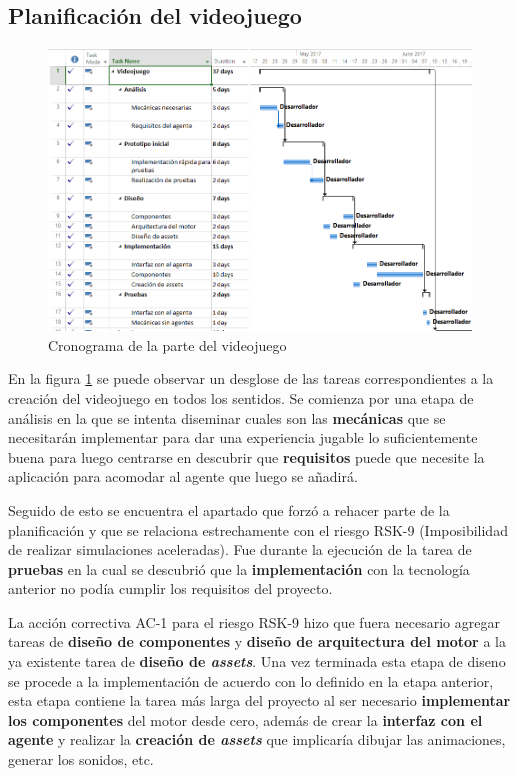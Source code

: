 \subsection{Planificación del videojuego}

\begin{figure}
	\centerline{\includegraphics[width=19cm]{otros/capturasPlanificacion/videojuego.PNG}}
	\caption{Cronograma de la parte del videojuego}
	\label{plan:videojuego}
\end{figure}

En la figura \ref{plan:videojuego} se puede observar un desglose de las tareas correspondientes a la creación del videojuego en todos los sentidos. Se comienza por una etapa de análisis en la que se intenta diseminar cuales son las \textbf{mecánicas} que se necesitarán implementar para dar una experiencia jugable lo suficientemente buena para luego centrarse en descubrir que \textbf{requisitos} puede que necesite la aplicación para acomodar al agente que luego se añadirá.

\bigskip

Seguido de esto se encuentra el apartado que forzó a rehacer parte de la planificación y que se relaciona estrechamente con el riesgo RSK-9 (Imposibilidad de realizar simulaciones aceleradas). Fue durante la ejecución de la tarea de \textbf{pruebas} en la cual se descubrió que la \textbf{implementación} con la tecnología anterior no podía cumplir los requisitos del proyecto.

\bigskip

La acción correctiva AC-1 para el riesgo RSK-9 hizo que fuera necesario agregar tareas de \textbf{diseño de componentes} y \textbf{diseño de arquitectura del motor} a la ya existente tarea de \textbf{diseño de \textit{assets}}. Una vez terminada esta etapa de diseno se procede a la implementación de acuerdo con lo definido en la etapa anterior, esta etapa contiene la tarea más larga del proyecto al ser necesario \textbf{implementar los componentes} del motor desde cero, además de crear la \textbf{interfaz con el agente} y realizar la \textbf{creación de \textit{assets}} que implicaría dibujar las animaciones, generar los sonidos, etc.

